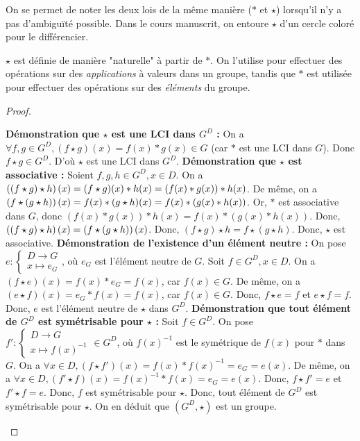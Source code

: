 \documentclass[12pt, a4paper]{report}
\begin{document}
\begin{remark}
    On se permet de noter les deux lois de la même manière ($*$ et $\star$) lorsqu'il n'y a pas d'ambiguïté possible. Dans le cours manuscrit, on entoure $\star$ d'un cercle coloré pour le différencier.
\end{remark}

\begin{attention}
    $\star$ est définie de manière "naturelle" à partir de $*$. On l'utilise pour effectuer des opérations sur des \textit{applications} à valeurs dans un groupe, tandis que $*$ est utilisée pour effectuer des opérations sur des \textit{éléments} du groupe.
\end{attention}

\begin{proof}
    \begin{outline}
        \1 \textbf{Démonstration que $\star$ est une LCI dans $G^D$ :}
        \2 On a $\forall f,g \in G^D, (f \star g)(x)=f(x) * g(x) \in G$ (car $*$ est une LCI dans $G$).
        \2 Donc $f \star g \in G^D$.
        \2 D'où $\star$ est une LCI dans $G^D$.
        \1 \textbf{Démonstration que $\star$ est associative :}
        \2 Soient $f,g,h \in G^D,x\in D$.
        \2 On a $\left((f \star g) \star h\right)(x) = (f \star g)(x) * h(x) = (f(x) * g(x)) * h(x)$.
        \2 De même, on a $\left(f \star (g \star h)\right)(x) = f(x) * (g \star h)(x) = f(x) * (g(x) * h(x))$.
        \2 Or, $*$ est associative dans $G$, donc $(f(x) * g(x)) * h(x) = f(x) * (g(x) * h(x))$.
        \2 Donc, $\left((f \star g) \star h\right)(x) = \left(f \star (g \star h)\right)(x)$.
        \2 Donc, $(f \star g) \star h = f \star (g \star h)$.
        \2 Donc, $\star$ est associative.
        \1 \textbf{Démonstration de l'existence d'un élément neutre :}
        \2 On pose $e : \begin{cases}D \to G\\x \mapsto e_G\end{cases}$, où $e_G$ est l'élément neutre de $G$.
        \2 Soit $f \in G^D, x \in D$.
        \2 On a $(f \star e)(x) = f(x) * e_G = f(x)$, car $f(x) \in G$.
        \2 De même, on a $(e \star f)(x) = e_G * f(x) = f(x)$, car $f(x) \in G$.
        \2 Donc, $f \star e = f$ et $e \star f = f$.
        \2 Donc, $e$ est l'élément neutre de $\star$ dans $G^D$.
        \1 \textbf{Démonstration que tout élément de $G^D$ est symétrisable pour $\star$ :}
        \2 Soit $f \in G^D$.
        \2 On pose $f' : \begin{cases}D \to G\\x \mapsto f(x)^{-1}\end{cases} \in G^D$, où $f(x)^{-1}$ est le symétrique de $f(x)$ pour $*$ dans $G$.
        \2 On a $\forall x \in D, (f \star f')(x) = f(x) * f(x)^{-1} = e_G = e(x)$.
        \2 De même, on a $\forall x \in D, (f' \star f)(x) = f(x)^{-1} * f(x) = e_G = e(x)$.
        \2 Donc, $f \star f' = e$ et $f' \star f = e$.
        \2 Donc, $f$ est symétrisable pour $\star$.
        \2 Donc, tout élément de $G^D$ est symétrisable pour $\star$.
        \1 On en déduit que $(G^D, \star)$ est un groupe.
    \end{outline}
\end{proof}
\end{document}

